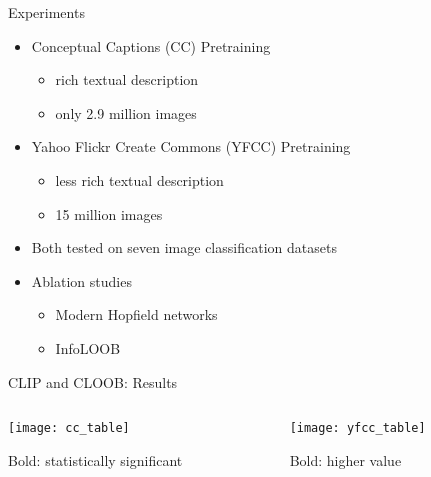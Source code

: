 \documentclass[utf8,aspectratio=169,ngerman,english,usenames,dvipsnames]{beamer}
\begin{document}
\begin{frame}{Experiments}
    \pause
    \begin{itemize}
        \item Conceptual Captions (CC) Pretraining
        \begin{itemize}
            \item rich textual description
            \item only 2.9 million images
        \end{itemize}
        \pause
        \item Yahoo Flickr Create Commons (YFCC) Pretraining
        \begin{itemize}
            \item less rich textual description
            \item 15 million images
        \end{itemize}
        \pause
        \item Both tested on seven image classification datasets
        \pause
        \item Ablation studies
        \begin{itemize}
            \item Modern Hopfield networks
            \item InfoLOOB
        \end{itemize}
    \end{itemize}
\end{frame}

\begin{frame}{CLIP and CLOOB: Results}
    \begin{columns}
        \begin{column}{0.5\textwidth}
            \begin{table}
                \centering
                \caption*{CC --- mean accuracy over 5 runs}
                \texttt{[image: cc\_table]}
            \end{table}
            \centering
            Bold: statistically significant
        \end{column}
        \begin{column}{0.5\textwidth}
            \begin{table}
                \centering
                \caption*{YFCC --- one run}
                \texttt{[image: yfcc\_table]}
            \end{table}
            \centering
            Bold: higher value
        \end{column}
    \end{columns}
\end{frame}
\end{document}
